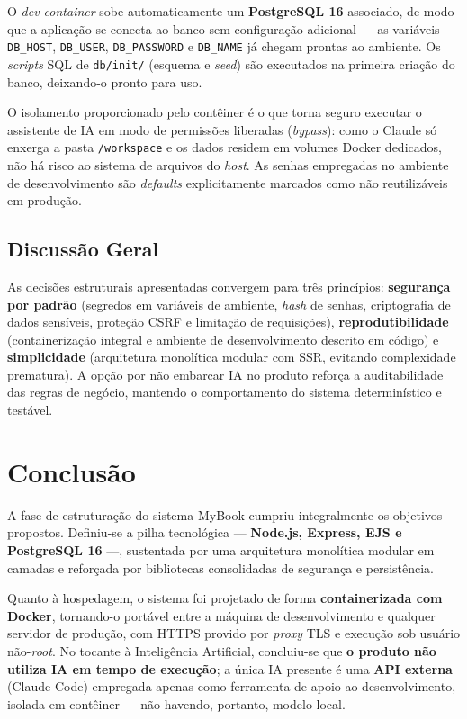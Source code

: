 \documentclass[a4paper,12pt]{article}
\begin{document}
O \emph{dev container} sobe automaticamente um \textbf{PostgreSQL 16} associado, de modo
que a aplicação se conecta ao banco sem configuração adicional --- as variáveis
\texttt{DB\_HOST}, \texttt{DB\_USER}, \texttt{DB\_PASSWORD} e \texttt{DB\_NAME} já chegam
prontas ao ambiente. Os \emph{scripts} SQL de \texttt{db/init/} (esquema e \emph{seed})
são executados na primeira criação do banco, deixando-o pronto para uso.

O isolamento proporcionado pelo contêiner é o que torna seguro executar o assistente de
IA em modo de permissões liberadas (\emph{bypass}): como o Claude só enxerga a pasta
\texttt{/workspace} e os dados residem em volumes Docker dedicados, não há risco ao
sistema de arquivos do \emph{host}. As senhas empregadas no ambiente de desenvolvimento
são \emph{defaults} explicitamente marcados como não reutilizáveis em produção.

\subsection{Discussão Geral}

As decisões estruturais apresentadas convergem para três princípios: \textbf{segurança
por padrão} (segredos em variáveis de ambiente, \emph{hash} de senhas, criptografia de
dados sensíveis, proteção CSRF e limitação de requisições), \textbf{reprodutibilidade}
(containerização integral e ambiente de desenvolvimento descrito em código) e
\textbf{simplicidade} (arquitetura monolítica modular com SSR, evitando complexidade
prematura). A opção por não embarcar IA no produto reforça a auditabilidade das regras de
negócio, mantendo o comportamento do sistema determinístico e testável.

\section{Conclusão}

A fase de estruturação do sistema MyBook cumpriu integralmente os objetivos propostos.
Definiu-se a pilha tecnológica --- \textbf{Node.js, Express, EJS e PostgreSQL 16} ---,
sustentada por uma arquitetura monolítica modular em camadas e reforçada por bibliotecas
consolidadas de segurança e persistência.

Quanto à hospedagem, o sistema foi projetado de forma \textbf{containerizada com Docker},
tornando-o portável entre a máquina de desenvolvimento e qualquer servidor de produção,
com HTTPS provido por \emph{proxy} TLS e execução sob usuário não-\emph{root}. No tocante
à Inteligência Artificial, concluiu-se que \textbf{o produto não utiliza IA em tempo de
execução}; a única IA presente é uma \textbf{API externa} (Claude Code) empregada apenas
como ferramenta de apoio ao desenvolvimento, isolada em contêiner --- não havendo,
portanto, modelo local.
\end{document}
